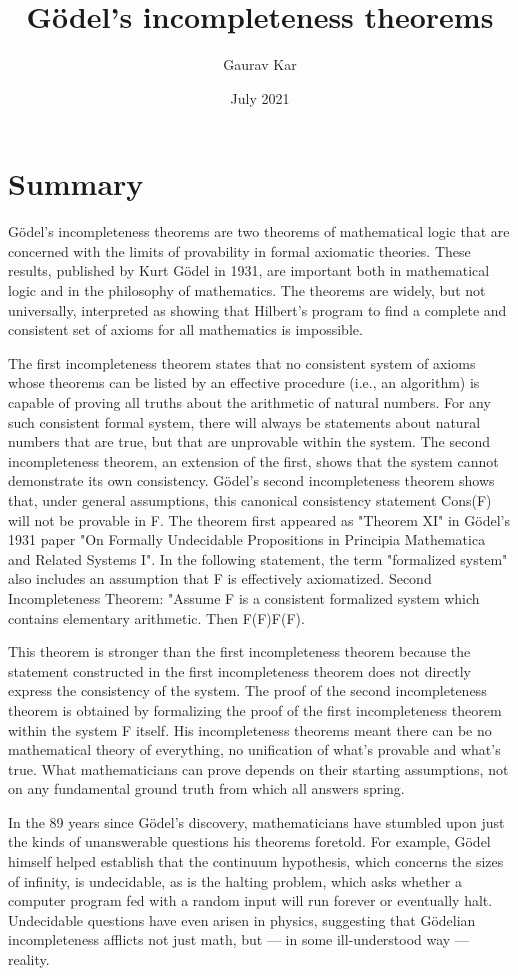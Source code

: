 \documentclass{article}
\title{Gödel's incompleteness theorems}
\author{Gaurav Kar}
\date{July 2021}
\begin{document}
\maketitle

\section{Summary}
Gödel's incompleteness theorems are two theorems of mathematical logic that are concerned with the limits of provability in formal axiomatic theories. These results, published by Kurt Gödel in 1931, are important both in mathematical logic and in the philosophy of mathematics. The theorems are widely, but not universally, interpreted as showing that Hilbert's program to find a complete and consistent set of axioms for all mathematics is impossible.

The first incompleteness theorem states that no consistent system of axioms whose theorems can be listed by an effective procedure (i.e., an algorithm) is capable of proving all truths about the arithmetic of natural numbers. For any such consistent formal system, there will always be statements about natural numbers that are true, but that are unprovable within the system. The second incompleteness theorem, an extension of the first, shows that the system cannot demonstrate its own consistency.
Gödel's second incompleteness theorem shows that, under general assumptions, this canonical consistency statement Cons(F) will not be provable in F. The theorem first appeared as "Theorem XI" in Gödel's 1931 paper "On Formally Undecidable Propositions in Principia Mathematica and Related Systems I". In the following statement, the term "formalized system" also includes an assumption that F is effectively axiomatized. Second Incompleteness Theorem: "Assume F is a consistent formalized system which contains elementary arithmetic. Then {\displaystyle F\not {}(F)}{\displaystyle F\not {}(F)}.

This theorem is stronger than the first incompleteness theorem because the statement constructed in the first incompleteness theorem does not directly express the consistency of the system. The proof of the second incompleteness theorem is obtained by formalizing the proof of the first incompleteness theorem within the system F itself.
His incompleteness theorems meant there can be no mathematical theory of everything, no unification of what’s provable and what’s true. What mathematicians can prove depends on their starting assumptions, not on any fundamental ground truth from which all answers spring.

In the 89 years since Gödel’s discovery, mathematicians have stumbled upon just the kinds of unanswerable questions his theorems foretold. For example, Gödel himself helped establish that the continuum hypothesis, which concerns the sizes of infinity, is undecidable, as is the halting problem, which asks whether a computer program fed with a random input will run forever or eventually halt. Undecidable questions have even arisen in physics, suggesting that Gödelian incompleteness afflicts not just math, but — in some ill-understood way — reality.
\end{document}

